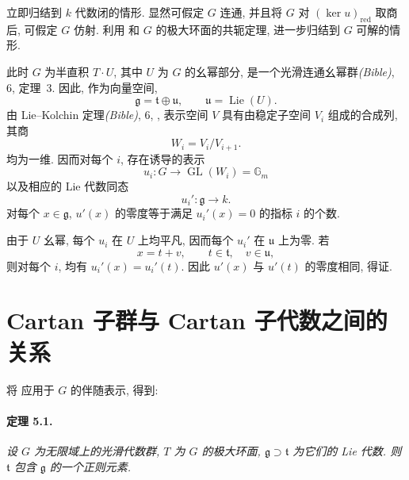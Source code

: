 立即归结到 \(k\) 代数闭的情形. 显然可假定 \(G\) 连通, 并且将 \(G\) 对 \((\ker u)_{\mathrm{red}}\) 取商后, 可假定 \(G\) 仿射. 利用  和 \(G\) 的极大环面的共轭定理, 进一步归结到 \(G\) 可解的情形.

此时 \(G\) 为半直积 \(T\cdot U\), 其中 \(U\) 为 \(G\) 的幺幂部分, 是一个光滑连通幺幂群\textup{\emph{(Bible)}, 6, 定理~3}. 因此, 作为向量空间,
\[
  \mathfrak g=\mathfrak t\oplus\mathfrak u,
  \qquad
  \mathfrak u=\operatorname{Lie}(U).
\]
由 Lie--Kolchin 定理\textup{\emph{(Bible)}, 6, }, 表示空间 \(V\) 具有由稳定子空间 \(V_i\) 组成的合成列, 其商
\[
  W_i=V_i/V_{i+1}.
\]
均为一维. 因而对每个 \(i\), 存在诱导的表示
\[
  u_i\colon G\longrightarrow
  \operatorname{GL}(W_i)=\mathbb G_m
\]
以及相应的 Lie 代数同态
\[
  u_i'\colon\mathfrak g\longrightarrow k.
\]
对每个 \(x\in\mathfrak g\), \(u'(x)\) 的零度等于满足 \(u_i'(x)=0\) 的指标 \(i\) 的个数.

由于 \(U\) 幺幂, 每个 \(u_i\) 在 \(U\) 上均平凡, 因而每个 \(u_i'\) 在 \(\mathfrak u\) 上为零. 若
\[
  x=t+v,\qquad t\in\mathfrak t,\quad v\in\mathfrak u,
\]
则对每个 \(i\), 均有 \(u_i'(x)=u_i'(t)\). 因此 \(u'(x)\) 与 \(u'(t)\) 的零度相同,  得证.



\section{Cartan 子群与 Cartan 子代数之间的关系}

将  应用于 \(G\) 的伴随表示, 得到:

\paragraph{\textbf{定理 5.1.}}
{\itshape 设 \(G\) 为无限域上的光滑代数群, \(T\) 为 \(G\) 的极大环面, \(\mathfrak g\supset\mathfrak t\) 为它们的 Lie 代数. 则 \(\mathfrak t\) 包含 \(\mathfrak g\) 的一个正则元素.}

